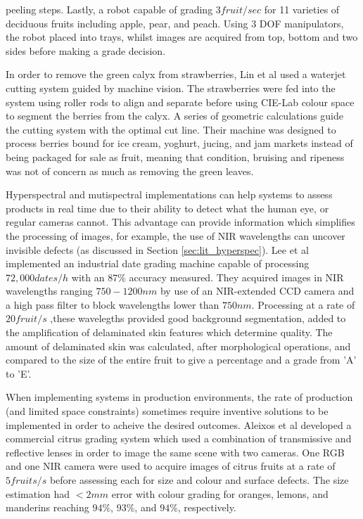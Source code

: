 \documentclass[fleqn,twoside,12pt]{report}
\begin{document}
peeling steps. Lastly, a robot capable of grading $3 fruit/sec$ for 11 varieties of deciduous fruits including apple, pear, and peach. Using 3 DOF manipulators, the robot placed into trays, whilst images are acquired from top, bottom and two sides before making a grade decision. 


In order to remove the green calyx from strawberries, Lin et al \cite{lin} used a waterjet cutting system guided by machine vision. The strawberries were fed into the system using roller rods to align and separate before using CIE-Lab colour space to segment the berries from the calyx. A series of geometric calculations guide the cutting system with the optimal cut line. Their machine was designed to process berries bound for ice cream, yoghurt, jucing, and jam markets instead of being packaged for sale as fruit, meaning that condition, bruising and ripeness was not of concern as much as removing the green leaves.

Hyperspectral and mutispectral implementations can help systems to assess products in real time due to their ability to detect what the human eye, or regular cameras cannot. This advantage can provide information which simplifies the processing of images, for example, the use of NIR wavelengths can uncover invisible defects (as discussed in Section \ref{sec:lit_hyperspec}). Lee et al \cite{lee} implemented an industrial date grading machine capable of processing $72,000 dates/h$ with an $87\%$ accuracy measured. They acquired images in NIR wavelengths ranging $750-1200nm$ by use of an NIR-extended CCD camera and a high pass filter to block wavelengths lower than $750nm$. Processing at a rate of $20 fruit/s$ ,these wavelegths provided good background segmentation, added to the amplification of delaminated skin features which determine quality. The amount of delaminated skin was calculated, after morphological operations, and compared to the size of the entire fruit to give a percentage and a grade from 'A' to 'E'. 

When implementing systems in production environments, the rate of production (and limited space constraints) sometimes require inventive solutions to be implemented in order to acheive the desired outcomes. Aleixos et al \cite{aleixos} developed a commercial citrus grading system which used a combination of transmissive and reflective lenses in order to image the same scene with two cameras. One RGB and one NIR camera were used to acquire images of citrus fruits at a rate of $5 fruits/s$ before assessing each for size and colour and surface defects. The size estimation had $<2mm$ error with colour grading for oranges, lemons, and manderins reaching $94\%$, $93\%$, and $94\%$, respectively.
\end{document}
